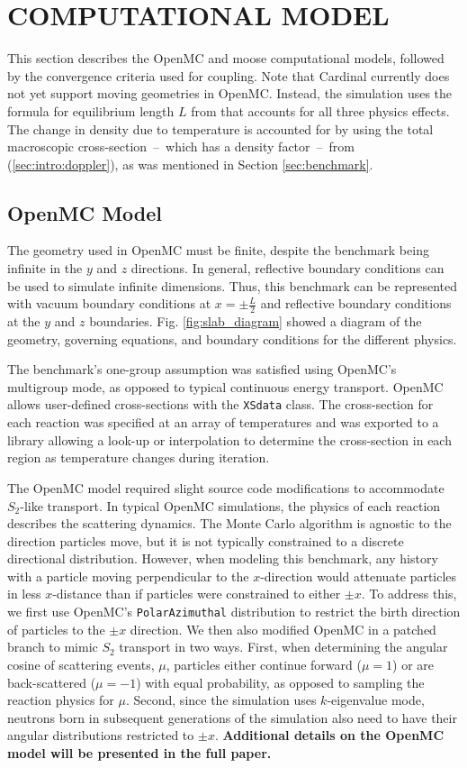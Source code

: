 \documentclass[letterpaper]{mc2023}
\begin{document}
\section{COMPUTATIONAL MODEL}
\label{sec:model}
This section describes the OpenMC and \gls{moose} computational models, followed by the convergence criteria used for coupling.
Note that Cardinal currently does not yet support moving geometries in OpenMC. Instead, the simulation uses the formula for
equilibrium length $L$ from \cite{analytical_benchmark} that accounts for all three physics effects. The change in density due
to temperature is accounted for by using the total macroscopic cross-section\ --\ which has a density factor\ --\ from
(\ref{sec:intro:doppler}), as was mentioned in Section \ref{sec:benchmark}.

\subsection{OpenMC Model}
The geometry used in OpenMC must be finite, despite the benchmark being infinite in the $y$ and $z$ directions. In general,
reflective boundary conditions can be used to simulate infinite dimensions. Thus, this benchmark can be represented with
vacuum boundary conditions at $x=\pm \frac{L}{2}$ and reflective boundary conditions at the $y$ and $z$ boundaries. Fig.
\ref{fig:slab_diagram} showed a diagram of the geometry, governing equations, and boundary conditions for the different physics.

The benchmark's one-group assumption was satisfied using OpenMC's multigroup mode, as opposed to typical continuous energy
transport. OpenMC allows user-defined cross-sections with the \texttt{XSdata} class. The cross-section for each reaction was
specified at an array of temperatures and was exported to a library allowing a look-up or interpolation to determine the
cross-section in each region as temperature changes during iteration.

The OpenMC model required slight source code modifications to accommodate $S_2$-like transport. In typical OpenMC simulations,
the physics of each reaction describes the scattering dynamics. The Monte Carlo algorithm is agnostic to the direction
particles move, but it is not typically constrained to a discrete directional distribution. However, when modeling this
benchmark, any history with a particle moving perpendicular to the $x$-direction would attenuate particles in less
$x$-distance than if particles were constrained to either $\pm x$. To address this, we first use OpenMC's \texttt{PolarAzimuthal}
distribution to restrict the birth direction of particles to the $\pm x$ direction. We then also modified OpenMC in a
patched branch to mimic $S_{2}$ transport in two ways. First, when determining the angular cosine of scattering events,
$\mu$, particles either continue forward ($\mu=1$) or are back-scattered ($\mu=-1$) with equal probability, as opposed to
sampling the reaction physics for $\mu$. Second, since the simulation uses $k$-eigenvalue mode, neutrons born in subsequent
generations of the simulation also need to have their angular distributions restricted to $\pm x$. \textbf{Additional details on
the OpenMC model will be presented in the full paper.}
\end{document}
